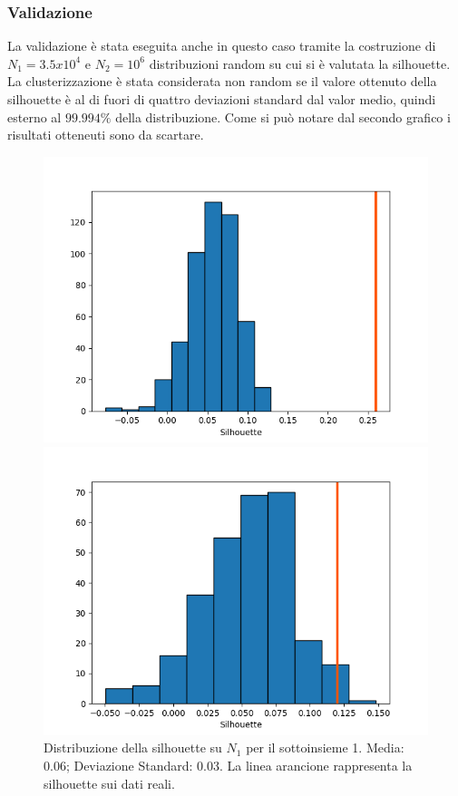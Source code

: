 \documentclass[a4paper,9pt]{article}
\begin{document}
\subsubsection{Validazione}
La validazione è stata eseguita anche in questo caso tramite la costruzione di $N_1=3.5x10^4$ e $N_2=10^6$ distribuzioni random su cui si è valutata la silhouette. La clusterizzazione è stata considerata non random se il valore ottenuto della silhouette è al di fuori di quattro deviazioni standard dal valor medio, quindi esterno al $99.994\%$ della distribuzione.
Come si può notare dal secondo grafico i risultati otteneuti sono da scartare.
\begin{figure}[H]
\begin{minipage}[b]{0.45\textwidth}
\centering
\includegraphics[width=\textwidth]{RandomSilhouetteDBSCAN_1.png}
\caption{Distribuzione della silhouette su $N_1$ per il sottoinsieme 1. Media: 0.06; Deviazione Standard: 0.03. La linea arancione rappresenta la silhouette sui dati reali.  }
\label{etichetta1}
\end{minipage}
\hfill
\begin{minipage}[b]{0.45\textwidth}
\centering
\includegraphics[width=\textwidth]{RandomSilhouetteDBSCAN_2.png}

\end{minipage}
\end{figure}
\end{document}
